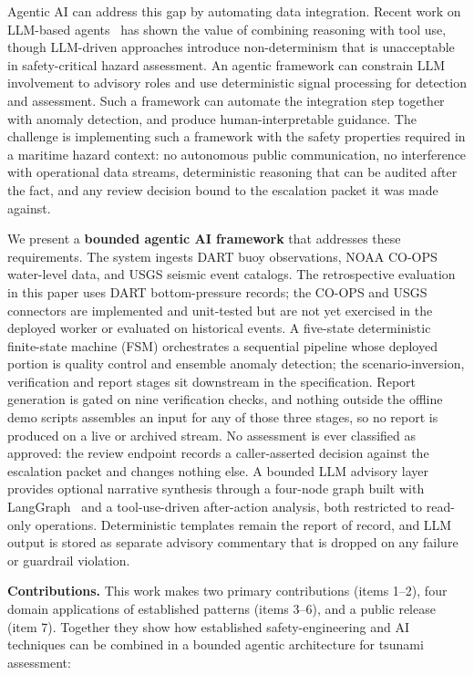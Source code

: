 \documentclass{article}
\begin{document}
Agentic AI can address this gap by automating data integration. Recent
work on LLM-based agents~\citep{yao2023react, wang2024survey} has
shown the value of combining reasoning with tool use, though
LLM-driven approaches introduce non-determinism that is unacceptable
in safety-critical hazard assessment. An agentic framework can constrain LLM involvement to advisory roles
and use deterministic signal processing for detection and assessment.
Such a framework can automate the integration step together with
anomaly detection, and produce human-interpretable guidance. The challenge is
implementing such a framework with the safety properties required in a
maritime hazard context: no autonomous public communication, no
interference with operational data streams, deterministic reasoning that
can be audited after the fact, and any review decision bound to the
escalation packet it was made against.

We present a \textbf{bounded agentic AI framework} that addresses these
requirements. The system ingests DART buoy observations, NOAA CO-OPS water-level
data, and USGS seismic event catalogs. The retrospective evaluation in
this paper uses DART bottom-pressure records; the CO-OPS and USGS
connectors are implemented and unit-tested but are not yet exercised in
the deployed worker or evaluated on historical events. A
five-state deterministic finite-state machine (FSM) orchestrates a
sequential pipeline whose deployed portion is quality control and
ensemble anomaly detection; the scenario-inversion, verification and
report stages sit downstream in the specification.  Report generation
is gated on nine verification checks, and nothing outside the offline
demo scripts assembles an input for any of those three stages, so no
report is produced on a live or archived stream.
No assessment is ever classified as approved: the review endpoint
records a caller-asserted decision against the escalation packet and
changes nothing else.
A bounded LLM advisory layer provides optional narrative synthesis
through a four-node graph built with LangGraph~\citep{langgraph2024}
and a tool-use-driven after-action analysis, both restricted to
read-only operations. Deterministic templates remain the report of
record, and LLM output is stored as separate advisory commentary that
is dropped on any failure or guardrail violation.

\textbf{Contributions.} This work makes two primary contributions
(items 1--2), four domain applications of established patterns
(items 3--6), and a public release (item 7). Together they show how
established safety-engineering and AI techniques can be combined in a
bounded agentic architecture for tsunami assessment:
\end{document}
